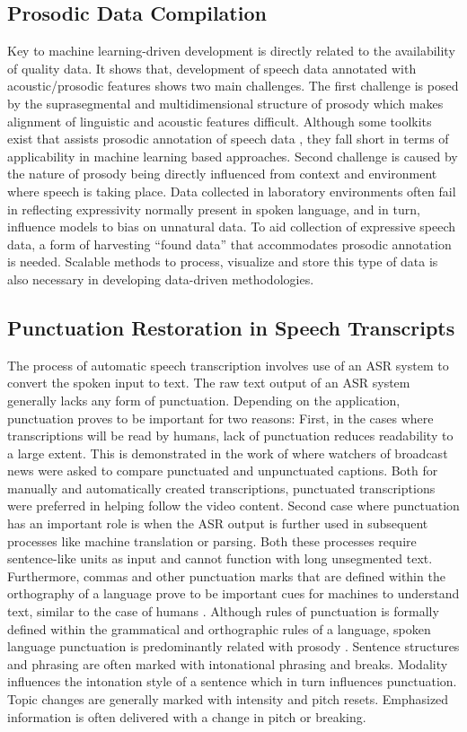 \subsection{Prosodic Data Compilation}
Key to machine learning-driven development is directly related to the availability of quality data. It shows that, development of speech data annotated with acoustic/prosodic features shows two main challenges. The first challenge is posed by the suprasegmental and multidimensional structure of prosody which makes alignment of linguistic and acoustic features difficult. Although some toolkits exist that assists prosodic annotation of speech data \citep{Rosenberg10}, they fall short in terms of applicability in machine learning based approaches. Second challenge is caused by the nature of prosody being directly influenced from context and environment where speech is taking place. Data collected in laboratory environments often fail in reflecting expressivity normally present in spoken language, and in turn, influence models to bias on unnatural data. To aid collection of expressive speech data, a form of harvesting ``found data'' that accommodates prosodic annotation is needed. Scalable methods to process, visualize and store this type of data is also necessary in developing data-driven methodologies.

\subsection{Punctuation Restoration in Speech Transcripts}
The process of automatic speech transcription involves use of an ASR system to convert the spoken input to text. The raw text output of an ASR system generally lacks any form of punctuation. Depending on the application, punctuation proves to be important for two reasons: First, in the cases where transcriptions will be read by humans, lack of punctuation reduces readability to a large extent. This is demonstrated in the work of \cite{Tundik2018} where watchers of broadcast news were asked to compare punctuated and unpunctuated captions. Both for manually and automatically created transcriptions, punctuated transcriptions were preferred in helping follow the video content. Second case where punctuation has an important role is when the ASR output is further used in subsequent processes like machine translation or parsing. Both these processes require sentence-like units as input and cannot function with long unsegmented text. Furthermore, commas and other punctuation marks that are defined within the orthography of a language prove to be important cues for machines to understand text, similar to the case of humans \citep{Cho2017NMTbasedSA, Jones:1994:ERP:991886.991960}. Although rules of punctuation is formally defined within the grammatical and orthographic rules of a language, spoken language punctuation is predominantly related with prosody \cite{wallace}. Sentence structures and phrasing are often marked with intonational phrasing and breaks. Modality influences the intonation style of a sentence which in turn influences punctuation. Topic changes are generally marked with intensity and pitch resets. Emphasized information is often delivered with a change in pitch or breaking. 

